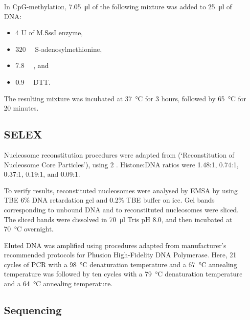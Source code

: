 \documentclass[parskip=full, numbers=noenddot]{scrreprt}
\begin{document}
In CpG-methylation, \SI{7.05}{\micro\litre} of the following mixture was added to \SI{25}{\micro\litre} of DNA:

\begin{itemize}
\item 4 U of M.SssI enzyme,
\item \SI{320}{\micro\Molar} S-adenosylmethionine,
\item \SI{7.8}{\milli\Molar} , and
\item \SI{0.9}{\milli\Molar} DTT.
\end{itemize}
\label{recipe:cpgmix}

The resulting mixture was incubated at \SI{37}{\celsius} for 3 hours, followed by \SI{65}{\celsius} for 20 minutes.

\subsection{SELEX}
\label{ssec:emsaselex_methods_selex}

Nucleosome reconstitution procedures were adapted from \citet{dyer_reconstitution_2003} (`Reconstitution of Nucleosome Core Particles'), using \SI{2}{\Molar} .  Histone:DNA ratios were 1.48:1, 0.74:1, 0.37:1, 0.19:1, and 0.09:1. %

To verify results, reconstituted nucleosomes were analysed by EMSA by using TBE 6\% DNA retardation gel and 0.2\% TBE buffer on ice.  Gel bands corresponding to unbound DNA and to reconstituted nucleosomes were sliced.  The sliced bands were dissolved in \SI{70}{\micro\litre} Tris pH 8.0, and then incubated at \SI{70}{\celsius} overnight.

Eluted DNA was amplified using procedures adapted from manufacturer's recommended protocols for Phusion High-Fidelity DNA Polymerase.  Here, 21 cycles of PCR with a \SI{98}{\celsius} denaturation temperature and a \SI{67}{\celsius} annealing temperature was followed by ten cycles with a \SI{79}{\celsius} denaturation temperature and a \SI{64}{\celsius} annealing temperature.

\subsection{Sequencing}
\label{ssec:emsaselex_methods_seq}
\end{document}
